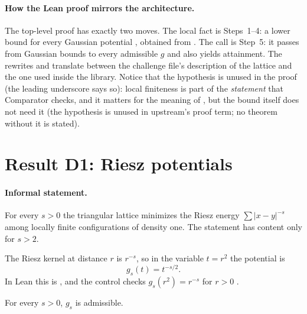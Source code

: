 \paragraph{How the Lean proof mirrors the architecture.} The top-level proof has exactly two moves. The local fact
 is Steps~1--4: a lower bound for every Gaussian potential , obtained from
. The call  is Step~5: it passes from Gaussian bounds
to every admissible $g$ and also yields attainment. The rewrites  and 
translate between the challenge file's description of the lattice and the one used inside the library. Notice that the
hypothesis  is unused in the proof (the leading underscore says so): local finiteness is
part of the \emph{statement} that Comparator checks, and it matters for the meaning of , but the bound
itself does not need it \tierC{} (the hypothesis is unused in upstream's proof term; no theorem without it is stated).

\section{Result D1: Riesz potentials}\label{ch2:sec:d1}

\paragraph{Informal statement.} For every $s>0$ the triangular lattice minimizes the Riesz energy
$\sum|x-y|^{-s}$ among locally finite configurations of density one. The statement has content only for $s>2$.

The Riesz kernel at distance $r$ is $r^{-s}$, so in the variable $t=r^2$ the potential is
\[
g_s(t)=t^{-s/2}.
\]
In Lean this is , and the control  checks
$g_s(r^2)=r^{-s}$ for $r>0$ \tierA.

\begin{lemma}[Admissibility]\label{ch2:lem:rieszadm}
For every $s>0$, $g_s$ is admissible.
\end{lemma}

